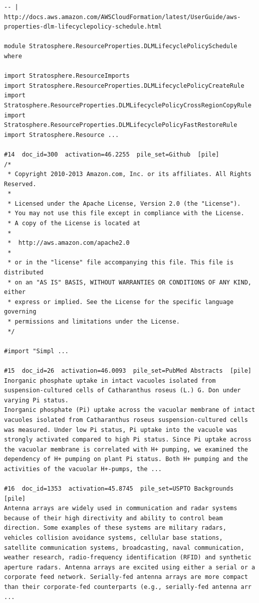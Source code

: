 \begin{verbatim}
-- | http://docs.aws.amazon.com/AWSCloudFormation/latest/UserGuide/aws-properties-dlm-lifecyclepolicy-schedule.html

module Stratosphere.ResourceProperties.DLMLifecyclePolicySchedule where

import Stratosphere.ResourceImports
import Stratosphere.ResourceProperties.DLMLifecyclePolicyCreateRule
import Stratosphere.ResourceProperties.DLMLifecyclePolicyCrossRegionCopyRule
import Stratosphere.ResourceProperties.DLMLifecyclePolicyFastRestoreRule
import Stratosphere.Resource ...

#14  doc_id=300  activation=46.2255  pile_set=Github  [pile]
/*
 * Copyright 2010-2013 Amazon.com, Inc. or its affiliates. All Rights Reserved.
 *
 * Licensed under the Apache License, Version 2.0 (the "License").
 * You may not use this file except in compliance with the License.
 * A copy of the License is located at
 *
 *  http://aws.amazon.com/apache2.0
 *
 * or in the "license" file accompanying this file. This file is distributed
 * on an "AS IS" BASIS, WITHOUT WARRANTIES OR CONDITIONS OF ANY KIND, either
 * express or implied. See the License for the specific language governing
 * permissions and limitations under the License.
 */

#import "Simpl ...

#15  doc_id=26  activation=46.0093  pile_set=PubMed Abstracts  [pile]
Inorganic phosphate uptake in intact vacuoles isolated from suspension-cultured cells of Catharanthus roseus (L.) G. Don under varying Pi status.
Inorganic phosphate (Pi) uptake across the vacuolar membrane of intact vacuoles isolated from Catharanthus roseus suspension-cultured cells was measured. Under low Pi status, Pi uptake into the vacuole was strongly activated compared to high Pi status. Since Pi uptake across the vacuolar membrane is correlated with H+ pumping, we examined the dependency of H+ pumping on plant Pi status. Both H+ pumping and the activities of the vacuolar H+-pumps, the ...

#16  doc_id=1353  activation=45.8745  pile_set=USPTO Backgrounds  [pile]
Antenna arrays are widely used in communication and radar systems because of their high directivity and ability to control beam direction. Some examples of these systems are military radars, vehicles collision avoidance systems, cellular base stations, satellite communication systems, broadcasting, naval communication, weather research, radio-frequency identification (RFID) and synthetic aperture radars. Antenna arrays are excited using either a serial or a corporate feed network. Serially-fed antenna arrays are more compact than their corporate-fed counterparts (e.g., serially-fed antenna arr ...


\end{verbatim}
